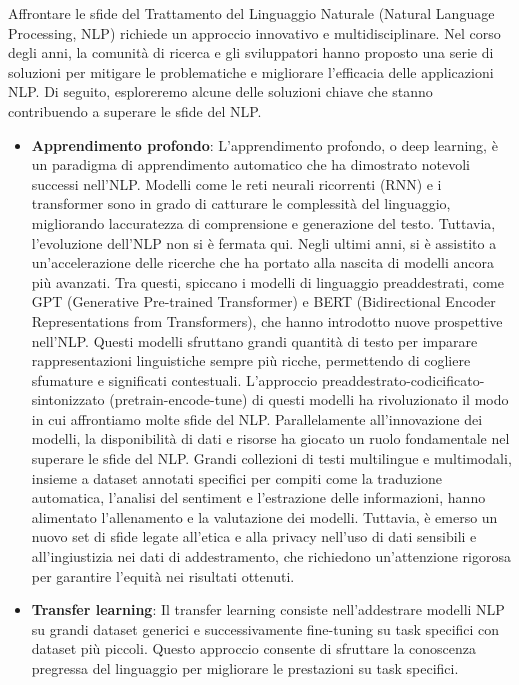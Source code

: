 Affrontare le sfide del Trattamento del Linguaggio Naturale (Natural Language Processing, NLP) richiede un approccio innovativo e multidisciplinare. Nel corso degli anni, la comunità di ricerca e gli sviluppatori hanno proposto una serie di soluzioni per mitigare le problematiche e migliorare l'efficacia delle applicazioni NLP. Di seguito, esploreremo alcune delle soluzioni chiave che stanno contribuendo a superare le sfide del NLP.
\begin{itemize}
    \item \textbf{Apprendimento profondo}:  L'apprendimento profondo, o deep learning, è un paradigma di apprendimento automatico che ha dimostrato notevoli successi nell'NLP. Modelli come le reti neurali ricorrenti (RNN) e i transformer sono in grado di catturare le complessità del linguaggio, migliorando laccuratezza di comprensione e generazione del testo. Tuttavia, l'evoluzione dell'NLP non si è fermata qui. Negli ultimi anni, si è assistito a un'accelerazione delle ricerche che ha portato alla nascita di modelli ancora più avanzati. Tra questi, spiccano i modelli di linguaggio preaddestrati, come GPT (Generative Pre-trained Transformer) e BERT (Bidirectional Encoder Representations from Transformers), che hanno introdotto nuove prospettive nell'NLP. Questi modelli sfruttano grandi quantità di testo per imparare rappresentazioni linguistiche sempre più ricche, permettendo di cogliere sfumature e significati contestuali. L'approccio preaddestrato-codicificato-sintonizzato (pretrain-encode-tune) di questi modelli ha rivoluzionato il modo in cui affrontiamo molte sfide del NLP. Parallelamente all'innovazione dei modelli, la disponibilità di dati e risorse ha giocato un ruolo fondamentale nel superare le sfide del NLP. Grandi collezioni di testi multilingue e multimodali, insieme a dataset annotati specifici per compiti come la traduzione automatica, l'analisi del sentiment e l'estrazione delle informazioni, hanno alimentato l'allenamento e la valutazione dei modelli. Tuttavia, è emerso un nuovo set di sfide legate all'etica e alla privacy nell'uso di dati sensibili e all'ingiustizia nei dati di addestramento, che richiedono un'attenzione rigorosa per garantire l'equità nei risultati ottenuti.
    
    \item \textbf{Transfer learning}: Il transfer learning consiste nell'addestrare modelli NLP su grandi dataset generici e successivamente fine-tuning su task specifici con dataset più piccoli. Questo approccio consente di sfruttare la conoscenza pregressa del linguaggio per migliorare le prestazioni su task specifici.


\end{itemize}
